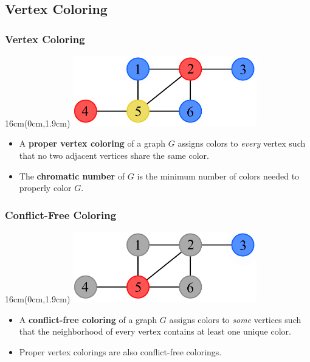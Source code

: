 \documentclass[xcolor=dvipsnames,aspectratio=1610]{beamer}
\newcommand{\exampleheight}{1.9cm}
\newcommand{\examplewidth}{16cm}
\begin{document}
\begin{frame}
  \end{frame}

  \subsection{Vertex Coloring}

  \begin{frame}
    \frametitle{Vertex Coloring}

    \begin{textblock*}{\examplewidth}(0cm,\exampleheight) %
      \centering
      \includegraphics[width=8cm]{../figures/example-vcp.pdf}
    \end{textblock*}

    \vspace{4.5cm}
    \vfill

    \begin{itemize}
      \item A \textbf{proper vertex coloring} of a graph $G$ assigns colors to \emph{every} vertex such that no two adjacent vertices share the same color.
      \pause
      \vfill
      \item The \textbf{chromatic number} of $G$ is the minimum number of colors needed to properly color $G$.
    \end{itemize}
  \end{frame}

  \begin{frame}
    \frametitle{Conflict-Free Coloring}

    \begin{textblock*}{\examplewidth}(0cm,\exampleheight) %
      \centering
      \includegraphics[width=8cm]{../figures/example-cfcp.pdf}
    \end{textblock*}

    \vspace{4.5cm}
    \vfill

    \begin{itemize}
      \item<1-2> A \textbf{conflict-free coloring} of a graph $G$ assigns colors to \emph{some} vertices such that the neighborhood of every vertex contains at least one unique color.
      \vfill
      \pause
      \item<2> Proper vertex colorings are also conflict-free colorings.
    \end{itemize}
  \end{frame}
\end{document}

